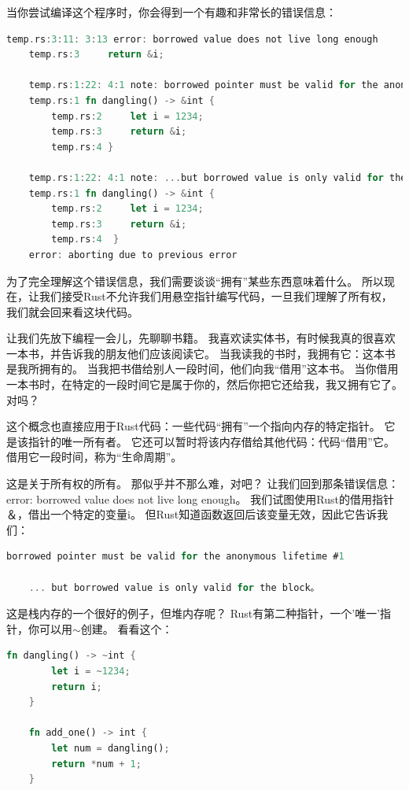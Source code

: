 当你尝试编译这个程序时，你会得到一个有趣和非常长的错误信息：
\begin{lstlisting}[language={Rust}, label={code:forktest},
	caption={forktest.rs}]
	temp.rs:3:11: 3:13 error: borrowed value does not live long enough
	temp.rs:3     return &i;
	
	temp.rs:1:22: 4:1 note: borrowed pointer must be valid for the anonymous lifetime #1 defined on the block at 1:22...
	temp.rs:1 fn dangling() -> &int {
		temp.rs:2     let i = 1234;
		temp.rs:3     return &i;
		temp.rs:4 }
	
	temp.rs:1:22: 4:1 note: ...but borrowed value is only valid for the block at 1:22
	temp.rs:1 fn dangling() -> &int {      
		temp.rs:2     let i = 1234;            
		temp.rs:3     return &i;               
		temp.rs:4  }                            
	error: aborting due to previous error
\end{lstlisting}

为了完全理解这个错误信息，我们需要谈谈“拥有”某些东西意味着什么。 所以现在，让我们接受Rust不允许我们用悬空指针编写代码，一旦我们理解了所有权，我们就会回来看这块代码。

让我们先放下编程一会儿，先聊聊书籍。 我喜欢读实体书，有时候我真的很喜欢一本书，并告诉我的朋友他们应该阅读它。 当我读我的书时，我拥有它：这本书是我所拥有的。 当我把书借给别人一段时间，他们向我“借用”这本书。 当你借用一本书时，在特定的一段时间它是属于你的，然后你把它还给我，我又拥有它了。 对吗？

这个概念也直接应用于Rust代码：一些代码“拥有”一个指向内存的特定指针。 它是该指针的唯一所有者。 它还可以暂时将该内存借给其他代码：代码“借用”它。 借用它一段时间，称为“生命周期”。

这是关于所有权的所有。 那似乎并不那么难，对吧？ 让我们回到那条错误信息：error: borrowed value does not live long enough。 我们试图使用Rust的借用指针＆，借出一个特定的变量i。 但Rust知道函数返回后该变量无效，因此它告诉我们：
\begin{lstlisting}[language={Rust}, label={code:forktest},
	caption={forktest.rs}]
	borrowed pointer must be valid for the anonymous lifetime #1
	
	... but borrowed value is only valid for the block。
\end{lstlisting}

这是栈内存的一个很好的例子，但堆内存呢？ Rust有第二种指针，一个'唯一'指针，你可以用$\sim$创建。 看看这个：
\begin{lstlisting}[language={Rust}, label={code:forktest},
	caption={forktest.rs}]
	fn dangling() -> ~int {
		let i = ~1234;
		return i;
	}
	
	fn add_one() -> int {
		let num = dangling();
		return *num + 1;
	}
\end{lstlisting}

